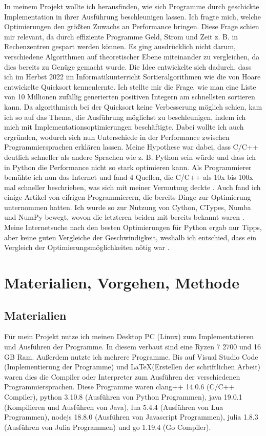 \documentclass[11pt,a4paper]{article}
\begin{document}
In meinem Projekt wollte ich herausfinden, wie sich Programme durch geschickte Implementation
in ihrer Ausführung beschleunigen lassen. Ich fragte mich, welche Optimierungen den größten Zuwachs
an Performance bringen. Diese Frage schien mir relevant, da durch effiziente Programme Geld, Strom
und Zeit z. B. in Rechenzentren gespart werden können.
Es ging ausdrücklich nicht darum, verschiedene Algorithmen auf theoretischer Ebene
miteinander zu vergleichen, da dies bereits zu Genüge gemacht wurde. \cite{sortieralgorithmenwikipedia}
Die Idee entwickelte sich dadurch, dass ich im Herbst 2022 im Informatikunterricht
Sortieralgorithmen wie die von Hoare entwickelte Quicksort kennenlernte. \cite{quicksortwikipedia}
Ich stellte mir die Frage, wie man eine Liste von 10 Millionen zufällig generierten positiven Integern
am schnellsten sortieren kann. Da algorithmisch bei der Quicksort keine Verbesserung möglich schien,
kam ich so auf das Thema, die Ausführung möglichst zu beschleunigen, indem ich mich mit
Implementationsoptimierungen beschäftigte. Dabei wollte ich auch ergründen, wodurch sich nun Unterschiede
in der Performance zwischen Programmiersprachen erklären lassen. Meine Hypothese war dabei,
dass C/C++ deutlich schneller als andere Sprachen wie z. B. Python sein würde und dass
ich in Python die Performance nicht so stark optimieren kann.  Als Programmierer bemühte ich
nun das Internet und fand 4 Quellen, die C/C++ als 10x bis 100x mal schneller beschrieben,
was sich mit meiner Vermutung deckte \cite{pyengineeringvscpp} \cite{quorepythonvscpp}
\cite{stopythonvscpp}.
Auch fand ich einige Artikel von eifrigen Programmierern, die bereits Dinge zur Optimierung
unternommen hatten. Ich wurde so zur Nutzung von Cython, CTypes, Numba und NumPy bewegt,
wovon die letzteren beiden mit bereits bekannt waren \cite{cythonctypes}.
Meine Internetsuche nach den besten Optimierungen für Python ergab nur Tipps, aber keine
guten Vergleiche der Geschwindigkeit, weshalb ich entschied, dass ein Vergleich der Optimierungsmöglichkeiten nötig war
\cite{pythonopt1} \cite{pythonopt2} \cite{pythonopt3}.

\section{Materialien, Vorgehen, Methode}

\subsection{Materialien}
Für mein Projekt nutze ich meinen Desktop PC (Linux) zum Implementatieren und Ausführen der Programme.
In diesem verbaut sind eine Ryzen 7 2700 und 16 GB Ram. Außerdem nutzte ich mehrere Programme.
Bis auf Visual Studio Code (Implementierung der Programme) und \LaTeX (Erstellen der schriftlichen Arbeit)
waren dies die Compiler oder Interpreter zum Ausführen der verschiedenen Programmiersprachen.
Diese Programme waren clang++ 14.0.6 (C/C++ Compiler), python 3.10.8 (Ausführen von Python Programmen),
java 19.0.1 (Kompilieren und Ausführen von Java), lua 5.4.4 (Ausführen von Lua Programmen),
nodejs 18.8.0 (Ausführen von Javascript Programmen), julia 1.8.3 (Ausführen von Julia Programmen)
und go 1.19.4 (Go Compiler).
\end{document}
